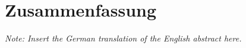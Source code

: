\chapter{Zusammenfassung}

\textit{Note: Insert the German translation of the English abstract here.}
